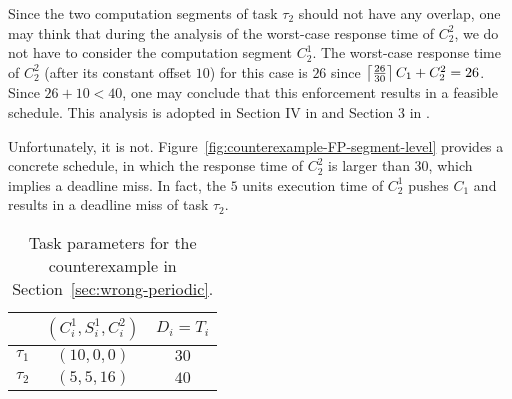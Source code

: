 Since the two computation segments of task $\tau_2$ should not have any overlap, one may think that during the analysis of the worst-case response time of $C_2^2$, we do not have to consider the computation segment $C_2^1$. The worst-case response time of $C_2^2$ (after its constant offset $10$) for this case is $26$ since $\left\lceil{\frac{26}{30}}\right\rceil C_1 + C_2^2 = 26$. 
Since $26+10 < 40$, one may conclude that this enforcement results in a feasible schedule. This analysis is adopted in Section IV in \cite{RTSS-KimANR13} and Section 3 in \cite{DBLP:journals/ieicet/DingTT09}. 

Unfortunately, it is not. Figure~\ref{fig:counterexample-FP-segment-level} provides a concrete schedule, in which the response time of $C_2^2$ is larger than $30$, which implies a deadline miss. In fact, the $5$ units execution time of $C_2^1$ pushes $C_1$ and results in a deadline miss of task $\tau_2$.

\begin{table} [t]
\centering
    \begin{tabular}{|c|c|c|}
 \hline
        & $(C_i^1, S_i^1, C_i^2)$ &  $D_i=T_i$\\ 
        \hline
        $\tau_1$ & $(10, 0, 0)$ &  $30$\\ 
        $\tau_2$ &  $(5, 5, 16)$ & $40$  \\ 
        \hline
    \end{tabular} 
    \caption{Task parameters for the counterexample in Section~\ref{sec:wrong-periodic}.}
    \label{table:ex-periodic}
\end{table}



